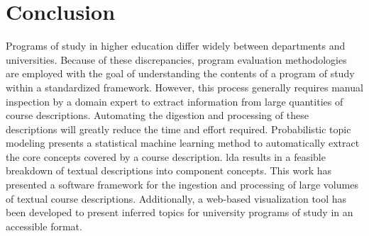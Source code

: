 \section{Conclusion}
\label{sec:conclusion}


Programs of study in higher education differ widely between departments and universities.
Because of these discrepancies, program evaluation methodologies are employed with the goal of understanding the contents of a program of study within a standardized framework.
However, this process generally requires manual inspection by a domain expert to extract information from large quantities of course descriptions.
Automating the digestion and processing of these descriptions will greatly reduce the time and effort required.
Probabilistic topic modeling presents a statistical machine learning method to automatically extract the core concepts covered by a course description.
\acf{lda} results in a feasible breakdown of textual descriptions into component concepts.
This work has presented a software framework for the ingestion and processing of large volumes of textual course descriptions.
Additionally, a web-based visualization tool has been developed to present inferred topics for university programs of study in an accessible format.

